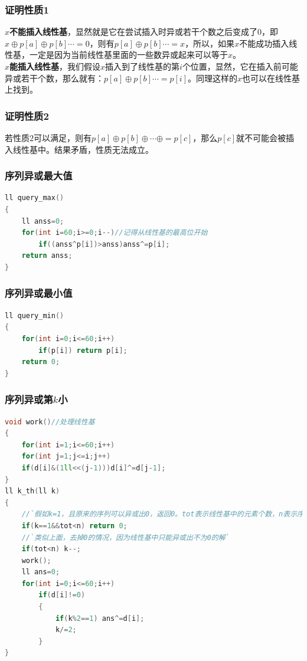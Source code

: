 \documentclass[a4paper]{book}
\begin{document}
\subsubsection{证明性质1}
$x$\textbf{不能插入线性基}，显然就是它在尝试插入时异或若干个数之后变成了$0$，即$x\oplus p[a] \oplus p[b] \cdots=0$，则有$p[a] \oplus p[b] \cdots=x$，所以，如果$x$不能成功插入线性基，一定是因为当前线性基里面的一些数异或起来可以等于$x$。\\
$x$\textbf{能插入线性基}，我们假设$x$插入到了线性基的第$i$个位置，显然，它在插入前可能异或若干个数，那么就有：$p[a] \oplus p[b] \cdots=p[i]$。同理这样的$x$也可以在线性基上找到。
\subsubsection{证明性质2}
若性质$2$可以满足，则有$p[a] \oplus p[b] \oplus \cdots\oplus =p[c]$，那么$p[c]$就不可能会被插入线性基中。结果矛盾，性质无法成立。
\subsubsection{序列异或最大值}
\begin{lstlisting}[language=c++]
ll query_max()
{
    ll anss=0;
    for(int i=60;i>=0;i--)//记得从线性基的最高位开始
        if((anss^p[i])>anss)anss^=p[i];
    return anss;
}    
\end{lstlisting}
\subsubsection{序列异或最小值}
\begin{lstlisting}[language=c++]
ll query_min()
{
    for(int i=0;i<=60;i++)
        if(p[i]) return p[i];
    return 0;
}    
\end{lstlisting}
\subsubsection{序列异或第$k$小}
\begin{lstlisting}[language=c++,escapeinside=``]
void work()//处理线性基
{
    for(int i=1;i<=60;i++)
    for(int j=1;j<=i;j++)
    if(d[i]&(1ll<<(j-1)))d[i]^=d[j-1];
}
ll k_th(ll k)
{
    //`假如k=1，且原来的序列可以异或出0，返回0。tot表示线性基中的元素个数，n表示序列长度`
    if(k==1&&tot<n) return 0;
    //`类似上面，去掉0的情况，因为线性基中只能异或出不为0的解`
    if(tot<n) k--;
    work();
    ll ans=0;
    for(int i=0;i<=60;i++)
        if(d[i]!=0)
        {
            if(k%2==1) ans^=d[i];
            k/=2;
        }
}
\end{lstlisting}
\end{document}
